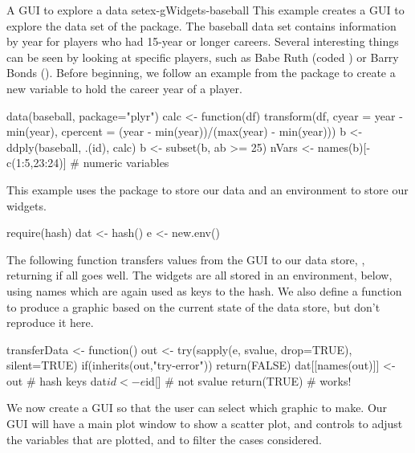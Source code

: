 \begin{example}{A GUI to explore a data set}{ex-gWidgets-baseball}
This example creates a GUI to explore the  data set of
the  package.  The baseball data set contains information by
year for players who had 15-year or longer careers. Several
interesting things can be seen by looking at specific players, such as
Babe Ruth (coded ) or Barry Bonds ().
Before beginning, we follow an example from the  package to create a
new variable to hold the career year of a player.
\begin{Schunk}
\begin{Sinput}
 data(baseball, package="plyr")
 calc <- function(df) 
   transform(df,
             cyear = year - min(year),
             cpercent = (year - min(year))/(max(year) - min(year)))
 b <- ddply(baseball, .(id), calc)
 b <- subset(b, ab >= 25) 
 nVars <- names(b)[-c(1:5,23:24)]    # numeric variables
\end{Sinput}
\end{Schunk}

This example uses the  package to store our data and an environment to store our widgets.
\begin{Schunk}
\begin{Sinput}
 require(hash)
 dat <- hash()
 e <- new.env()
\end{Sinput}
\end{Schunk}

The following function transfers values from the GUI to our data
store, , returning  if all goes well. The widgets
are all stored in an environment,  below, using names which
are again used as keys to the hash. We also define a function
 to produce a graphic based on the current state of the
data store, but don't reproduce it here.
\begin{Schunk}
\begin{Sinput}
 transferData <- function() {
   out <- try(sapply(e, svalue, drop=TRUE), silent=TRUE)
   if(inherits(out,"try-error"))
     return(FALSE)
   dat[[names(out)]] <- out              # hash keys
   dat$id <- e$id[]                      # not svalue
   return(TRUE)                          # works!
 }
\end{Sinput}
\end{Schunk}


We now create a GUI so that the user can select which graphic to
make. Our GUI will have a main plot window to show a scatter plot, and
controls to adjust the variables that are plotted, and to filter the cases
considered.


\end{example}
